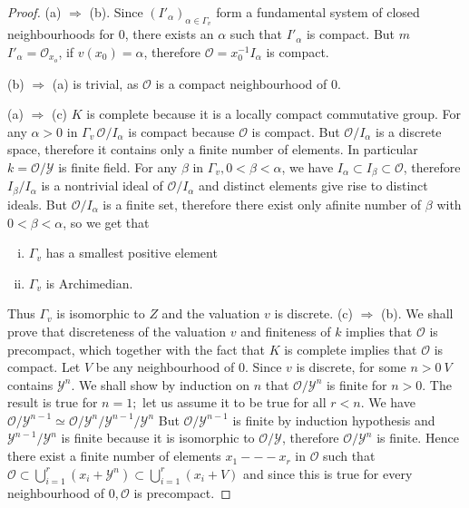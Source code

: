 \begin{proof}
  (a) $\Longrightarrow$ (b). Since $(I'_\alpha)_{\alpha \in \Gamma _v}$
  form a fundamental system of closed neighbourhoods for $0$, there
  exists an $\alpha$ such that $I'_\alpha$ is compact. But $m$
  $I'_\alpha=\mathscr{O}_{x_o}$, if $v(x_0)=\alpha$, therefore
  $\mathscr{O}=x^{-1}_{0} I_\alpha$ is compact. 

  (b) $\Longrightarrow$ (a) is trivial, as $\mathscr{O}$ is a compact
  neighbourhood of $0$.  
  
  (a) $\Longrightarrow$ (c) $K$ is complete because it is a locally
  compact commutative group. For any $\alpha > 0$ in $\Gamma_v
  \,\mathscr{O}/I_{\alpha}$ is compact because $\mathscr{O}$ is
  compact. But $\mathscr{O}/I_\alpha$ is a discrete space, therefore
  it contains only a finite number of elements. In particular
  $k=\mathscr{O}/\mathscr{Y}$ is finite field. For any $\beta$ in
  $\Gamma_v, 0 < \beta < \alpha$, we have $I_\alpha \subset I_\beta
  \subset \mathscr{O}$, therefore $I_\beta / I_\alpha$ is a nontrivial
  ideal of $\mathscr{O}/I_\alpha$ and distinct elements give rise to
  distinct ideals. But $\mathscr{O}/I_\alpha$ is a finite set,
  therefore there exist only a\pageoriginale finite number of $\beta$ with $0 <
  \beta < \alpha$, so we get that  
  \begin{enumerate}[(i)]
  \item $\Gamma_v$ has a smallest positive element
  \item $\Gamma_v$ is Archimedian.
  \end{enumerate}

  Thus $\Gamma_v$ is isomorphic to $Z$ and the valuation $v$ is
  discrete. (c) $\Longrightarrow$ (b). We shall prove that discreteness
  of the valuation $v$ and finiteness of $k$ implies that $\mathscr{O}$
  is precompact, which together with the fact that $K$ is complete
  implies that $\mathscr{O}$ is compact. Let $V$ be any neighbourhood of
  $0$. Since $v$ is discrete, for some $n > 0~V$ contains
  $\mathscr{Y}^n$. We shall show by induction on $n$ that
  $\mathscr{O}/\mathscr{Y}^n$ is finite for $n > 0$. The result is true
  for $n=1 ;$ let us assume it to be true for all $r < n$. We have
  $\mathscr{O} / \mathscr{Y}^{n-1} \simeq \mathscr{O}/\mathscr{Y}^n
  / \mathscr{Y}^{n-1} / \mathscr{Y}^n$ But $\mathscr{O} /
  \mathscr{Y}^{n-1}$ is finite by induction hypothesis and
  $\mathscr{Y}^{n-1} / \mathscr{Y}^n$ is finite because it is isomorphic
  to $\mathscr{O}/\mathscr{Y}$, therefore $\mathscr{O}/\mathscr{Y}^n$ is
  finite. Hence there exist a finite number of elements $x_1 - -- x_r$
  in $\mathscr{O}$ such that $\mathscr{O}\subset \bigcup\limits^{r}_{i
    =1}(x_i + \mathscr{Y}^n) \subset \bigcup\limits^{r}_{i= 1}(x_i + V)$
  and since this is true for every neighbourhood of $0, \mathscr{O}$ is
  precompact. 
\end{proof}

